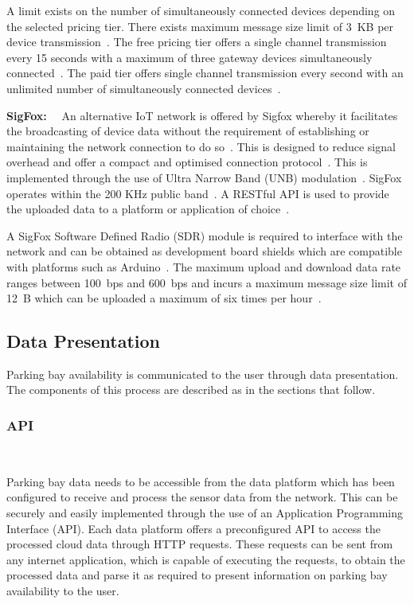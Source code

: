 \documentclass[10pt,twocolumn]{witseiepaper}
\begin{document}
				A limit exists on the number of simultaneously connected devices depending on the selected pricing tier. There exists maximum message size limit of 3~KB per device transmission~\cite{thing-quota}. The free pricing tier offers a single channel transmission every 15 seconds with a maximum of three gateway devices simultaneously connected~\cite{thing-quota}. The paid tier offers single channel transmission every second with an unlimited number of simultaneously connected devices~\cite{thing-quota}.
				
				\textbf{SigFox:}~~
				An alternative IoT network is offered by Sigfox whereby it facilitates the broadcasting of device data without the requirement of establishing or maintaining the network connection to do so~\cite{sigfox-tech}. This is designed to reduce signal overhead and offer a compact and optimised connection protocol~\cite{sigfox-security}. This is implemented through the use of Ultra Narrow Band (UNB) modulation~\cite{sigfox-tech}. SigFox operates within the 200 KHz public band~\cite{sigfox-tech}. A RESTful API is used to provide the uploaded data to a platform or application of choice~\cite{sigfox-security}.
				
				A SigFox Software Defined Radio (SDR) module is required to interface with the network and can be obtained as development board shields which are compatible with platforms such as Arduino~\cite{sigfox-tech}. The maximum upload and download data rate ranges between 100~bps and 600~bps and incurs a maximum message size limit of 12~B which can be uploaded a maximum of six times per hour~\cite{sigfox-tech}.
	
	\subsection{Data Presentation}
		Parking bay availability is communicated to the user through data presentation. The components of this process are described as in the sections that follow.
		
		\subsubsection{API} $   $
		
			Parking bay data needs to be accessible from the data platform which has been configured to receive and process the sensor data from the network. This can be securely and easily implemented through the use of an Application Programming Interface (API). Each data platform offers a preconfigured API to access the processed cloud data through HTTP requests. These requests can be sent from any internet application, which is capable of executing the requests, to obtain the processed data and parse it as required to present information on parking bay availability to the user.
		
\end{document}
